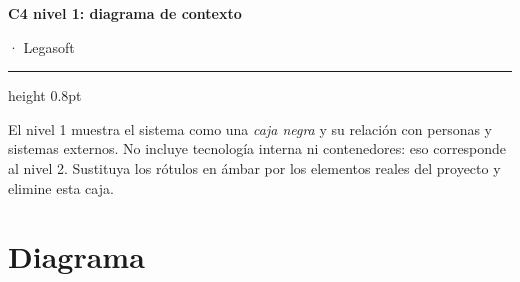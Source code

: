 \documentclass[11pt,a4paper]{article}
\begin{document}
\begin{center}
{\sffamily\bfseries\LARGE\color{lgPrimario} C4 nivel 1: diagrama de contexto\par}
\vspace{2pt}
{\sffamily\normalsize\color{lgGris}  · Legasoft\par}
\end{center}
\vspace{6pt}
{\color{lgBorde}\hrule height 0.8pt}
\vspace{10pt}

\begin{porcompletar}
El nivel 1 muestra el sistema como una \emph{caja negra} y su relación con
personas y sistemas externos. No incluye tecnología interna ni contenedores: eso
corresponde al nivel 2. Sustituya los rótulos en ámbar por los elementos reales
del proyecto y elimine esta caja.
\end{porcompletar}

\section*{Diagrama}
\end{document}

